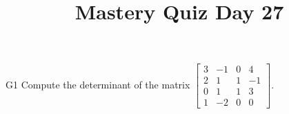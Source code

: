 \documentclass{sbgLAquiz}
\title{Mastery Quiz Day 27 }
\begin{document}
\begin{problem}{G1}
Compute the determinant of the matrix $\begin{bmatrix} 3 & -1 & 0 & 4 \\ 2 & 1 & 1& -1 \\ 0 & 1 & 1 & 3 \\ 1 & -2 & 0 & 0 \end{bmatrix}$.
\end{problem}
\end{document}
